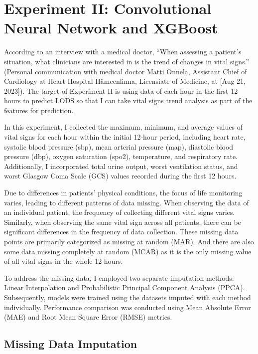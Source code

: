 \documentclass[12pt,a4paper,english
]{tunithesis}
\begin{document}
\section{Experiment II: Convolutional Neural Network and XGBoost}

According to an interview with a medical doctor, \enquote{When assessing a patient's situation, what clinicians are interested in is the trend of changes in vital signs.} (Personal communication with medical doctor Matti Onnela, Assistant Chief of Cardiology at Heart Hospital Hämeenlinna, Licensiate of Medicine, at [Aug 21, 2023]). The target of Experiment II is using data of each hour in the first 12 hours to predict LODS so that I can take vital signs trend analysis as part of the features for prediction.

In this experiment, I collected the maximum, minimum, and average values of vital signs for each hour within the initial 12-hour period, including heart rate, systolic blood pressure (sbp), mean arterial pressure (map), diastolic blood pressure (dbp), oxygen saturation (spo2), temperature, and respiratory rate. Additionally, I incorporated total urine output, worst ventilation status, and worst Glasgow Coma Scale (GCS) values recorded during the first 12 hours.

Due to differences in patients' physical conditions, the focus of life monitoring varies, leading to different patterns of data missing. When observing the data of an individual patient, the frequency of collecting different vital signs varies. Similarly, when observing the same vital sign across all patients, there can be significant differences in the frequency of data collection. These missing data points are primarily categorized as missing at random (MAR). And there are also some data missing completely at random (MCAR) as it is the only missing value of all vital signs in the whole 12 hours.

To address the missing data, I employed two separate imputation methods: Linear Interpolation and Probabilistic Principal Component Analysis (PPCA). Subsequently, models were trained using the datasets imputed with each method individually. Performance comparison was conducted using Mean Absolute Error (MAE) and Root Mean Square Error (RMSE) metrics.

\subsection{Missing Data Imputation}
\end{document}
